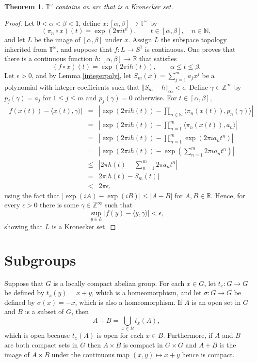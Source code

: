\documentclass{article}
\newcommand{\inner}[2]{\langle #1, #2 \rangle}
\newcommand{\norm}[1]{\Vert #1 \Vert}
\newtheorem{theorem}{Theorem}
\begin{document}
\begin{theorem}
$\mathbb{T}^\omega$ contains an arc that is a Kronecker set.
\end{theorem}
\begin{proof}
Let $0<\alpha<\beta<1$, define $x:[\alpha,\beta] \to \mathbb{T}^\omega$ by
\[
(\pi_n \circ x)(t) =\exp\left(2\pi i t^n \right), \qquad t \in [\alpha,\beta], \quad n \in \mathbb{N},
\]
and let $L$ be the image of $[\alpha,\beta]$ under $x$. Assign $L$ the subspace topology inherited from $\mathbb{T}^\omega$,
and suppose that $f:L \to S^1$ is continuous.
One proves that there is a continuous function $h:[\alpha,\beta] \to \mathbb{R}$  that satisfies
\[
(f \circ x)(t) = \exp(2\pi i h(t)), \qquad \alpha \leq t \leq \beta.
\]
Let $\epsilon>0$, and by Lemma \ref{integerpoly}, let $S_m(x)=\sum_{j=1}^m a_j x^j$ be a polynomial with integer coefficients such that $\norm{S_m-h}_\infty < \epsilon$.
Define $\gamma \in \mathbb{Z}^\infty$ by $p_j(\gamma) = a_j$ for $1 \leq j \leq m$ and $p_j(\gamma)=0$ otherwise. For $t \in [\alpha,\beta]$,
\begin{eqnarray*}
|f(x(t))-\inner{x(t)}{\gamma}| &=& \left| \exp(2\pi i h(t)) - \prod_{n \in \mathbb{N}} \inner{\pi_n(x(t))}{p_n(\gamma)} \right|\\
&=& \left| \exp(2\pi i h(t)) - \prod_{n=1}^m  \inner{\pi_n(x(t))}{a_n}  \right|\\
&=& \left| \exp(2\pi i h(t)) - \prod_{n=1}^m \exp(2\pi ia_n t^n) \right|\\
&=&\left| \exp(2\pi i h(t)) - \exp\left( \sum_{n=1}^m 2\pi ia_n t^n \right) \right| \\
&\leq&\left|2\pi h(t) -  \sum_{n=1}^m  2\pi a_n t^n \right|\\
&=&2\pi |h(t)-S_m(t)|\\
&<&2\pi \epsilon,
\end{eqnarray*}
using the fact that $|\exp(i A)-\exp(i B)| \leq |A-B|$ for $A,B \in \mathbb{R}$. Hence, for every $\epsilon>0$ there is some $\gamma \in \mathbb{Z}^\infty$ such
that
\[
\sup_{y \in L} |f(y)-\inner{y}{\gamma}|<\epsilon,
\]
showing that $L$ is a Kronecker set.
\end{proof}




\section{Subgroups}
Suppose that $G$ is a locally compact abelian group. For each $x \in G$, let $t_x:G \to G$ be defined by $t_x(y)=x+y$, which is a homeomorphism,
and let $\sigma:G \to G$ be defined by $\sigma(x)=-x$, which is also a homeomorphism.
If $A$ is an open set in $G$ and $B$ is a subset of $G$, 
then
\[
A+B = \bigcup_{x \in B} t_x(A),
\]
which is open because $t_x(A)$ is open for each $x \in B$. 
Furthermore, if $A$ and $B$ are both compact sets in $G$ then $A \times B$ is compact in $G \times G$ and $A+B$ is the image of $A \times B$
under the continuous map $(x,y) \mapsto x+y$ hence is compact. 
\end{document}
